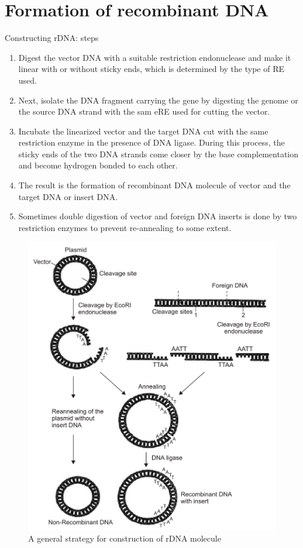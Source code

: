 \documentclass[11pt,dvipsnames,ignorenonframetext,aspectratio=169]{beamer}
\providecommand{\tightlist}{%
  \setlength{\itemsep}{0pt}\setlength{\parskip}{0pt}}
\begin{document}
\hypertarget{formation-of-recombinant-dna}{%
\section{Formation of recombinant
DNA}\label{formation-of-recombinant-dna}}

\begin{frame}{Constructing rDNA: steps}
\protect\hypertarget{constructing-rdna-steps}{}
\begin{enumerate}
\tightlist
\item
  Digest the vector DNA with a suitable restriction endonuclease and
  make it linear with or without sticky ends, which is determined by the
  type of RE used.
\item
  Next, isolate the DNA fragment carrying the gene by digesting the
  genome or the source DNA strand with the sam eRE used for cutting the
  vector.
\item
  Incubate the linearized vector and the target DNA cut with the same
  restriction enzyme in the presence of DNA ligase. During this process,
  the sticky ends of the two DNA strands come closer by the base
  complementation and become hydrogen bonded to each other.
\item
  The result is the formation of recombinant DNA molecule of vector and
  the target DNA or insert DNA.
\item
  Sometimes double digestion of vector and foreign DNA inserts is done
  by two restriction enzymes to prevent re-annealing to some extent.
\end{enumerate}
\end{frame}

\begin{frame}{}
\protect\hypertarget{section-14}{}
\begin{figure}
\includegraphics[width=0.35\linewidth]{./../images/construction_rdna_molecule} \caption{A general strategy for construction of rDNA molecule}\label{fig:rdna-construction}
\end{figure}
\end{frame}
\end{document}

